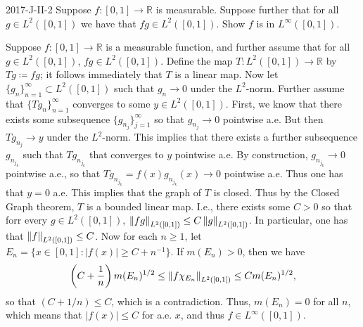 \documentclass{article}
\begin{document}
	\begin{prb}{2017-J-II-2}
		Suppose $f: [0,1] \to \mathbb{R}$ is measurable. Suppose further that for all $g \in L^2([0,1])$ we have that $fg \in L^2([0,1])$. Show $f$ is in $L^\infty([0,1])$. 
	\end{prb}
	Suppose $f: [0,1] \to \mathbb{R}$ is a measurable function, and further assume that for all $g \in L^2([0,1])$, $fg \in L^2([0,1])$. Define the map $T: L^2([0,1]) \to \mathbb{R}$ by $Tg\coloneqq fg$;  it follows immediately that $T$ is a linear map. Now let $\{g_n\}_{n =1}^{\infty} \subset L^2([0,1])$ such that $g_n \to 0$ under the $L^2$-norm. Further assume that $\{Tg_n\}_{n = 1}^{\infty}$ converges to some $y \in L^2([0,1])$. First, we know that there exists some subsequence $\{g_{n_{j}}\}_{j = 1}^\infty$ so that $g_{n_{j}} \to 0$ pointwise a.e. But then $Tg_{n_{j}} \to y$ under the $L^2$-norm. This implies that there exists a further subsequence $g_{n_{j_{k}}}$ such that $Tg_{n_{j_{k}}}$ that converges to $y$ pointwise a.e. By construction, $g_{n_{j_{k}}} \to 0$ pointwise a.e., so that $Tg_{n_{j_{k}}} = f(x)g_{n_{j_{k}}}(x) \to 0$ pointwise a.e. Thus one has that $y = 0$ a.e. This implies that the graph of $T$ is closed. Thus by the Closed Graph theorem, $T$ is a bounded linear map. I.e., there exists some $C > 0$ so that forr every $g \in L^2([0,1])$, $\left\Vert fg \right\Vert_{L^2([0,1])} \leq C\left\Vert g \right\Vert_{L^2([0,1])}$. In particular, one has that $\left\Vert f \right\Vert_{L^2([0,1])} \leq C$. Now for each $n \geq 1$, let $E_{n} = \{x \in [0,1]: |f(x)|\geq C + n^{-1}\}$. If $m(E_{n}) > 0$, then we have 
	\begin{equation*}
		\left(C + \frac{1}{n}\right)m(E_n)^{1/2} \leq \left\Vert f\chi_{E_{n}} \right\Vert_{L^{2}([0,1])} \leq Cm(E_n)^{1/2}, 
	\end{equation*}
	so that $(C + 1/n) \leq C$, which is a contradiction. Thus, $m(E_n) =0$ for all $n$, which means that $|f(x)| \leq C$ for a.e. $x$, and thus $f \in L^\infty([0,1])$. 
	
\end{document}
